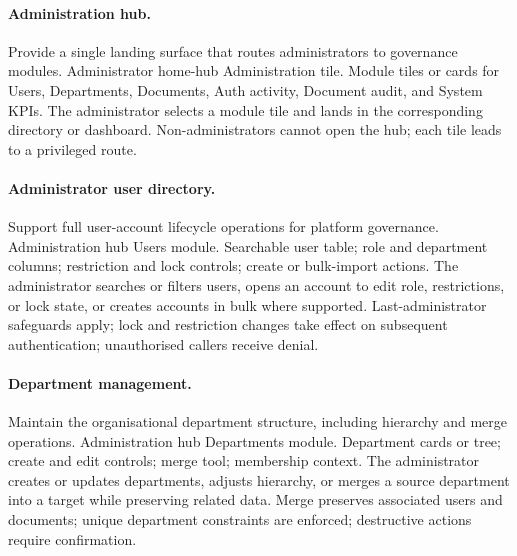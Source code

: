 \paragraph{Administration hub.}
\uiexplain
{Provide a single landing surface that routes administrators to governance
modules.}
{Administrator home-hub Administration tile.}
{Module tiles or cards for Users, Departments, Documents, Auth activity,
Document audit, and System KPIs.}
{The administrator selects a module tile and lands in the corresponding
directory or dashboard.}
{Non-administrators cannot open the hub; each tile leads to a privileged route.}

\paragraph{Administrator user directory.}
\uiexplain
{Support full user-account lifecycle operations for platform governance.}
{Administration hub Users module.}
{Searchable user table; role and department columns; restriction and lock
controls; create or bulk-import actions.}
{The administrator searches or filters users, opens an account to edit role,
restrictions, or lock state, or creates accounts in bulk where supported.}
{Last-administrator safeguards apply; lock and restriction changes take effect
on subsequent authentication; unauthorised callers receive denial.}

\paragraph{Department management.}
\uiexplain
{Maintain the organisational department structure, including hierarchy and
merge operations.}
{Administration hub Departments module.}
{Department cards or tree; create and edit controls; merge tool; membership
context.}
{The administrator creates or updates departments, adjusts hierarchy, or merges
a source department into a target while preserving related data.}
{Merge preserves associated users and documents; unique department constraints
are enforced; destructive actions require confirmation.}

